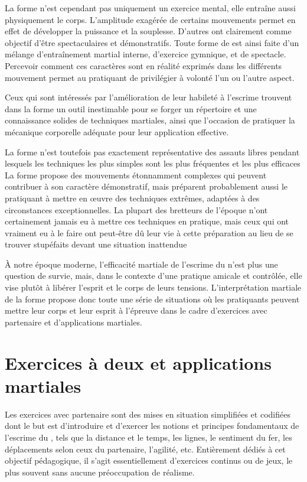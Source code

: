 La forme n'est cependant pas uniquement un exercice mental, elle entraîne aussi physiquement le corps. 
L'amplitude exagérée de certains mouvements permet en effet de développer la puissance et la souplesse.
D'autres ont clairement comme objectif d'être spectaculaires et démonstratifs.
Toute forme de \Taijijian{} est ainsi faite d'un mélange d'entraînement martial interne, d'exercice gymnique, et de spectacle.
Percevoir comment ces caractères sont en réalité exprimés dans les différents mouvement permet au pratiquant de privilégier à volonté l'un ou l'autre aspect. 

Ceux qui sont intéressés par l'amélioration de leur habileté à l'escrime trouvent dans la forme un outil inestimable pour se forger un répertoire et une connaissance solides de techniques martiales, ainsi que l'occasion de pratiquer la mécanique corporelle adéquate pour leur application effective.

La forme n'est toutefois pas exactement représentative des assauts libres pendant lesquels les techniques les plus simples sont les plus fréquentes et les plus efficaces
La forme propose des mouvements étonnamment complexes qui peuvent contribuer à son caractère démonstratif, mais préparent probablement aussi le pratiquant à mettre en \oe{}uvre des techniques extrêmes, adaptées à des circonstances exceptionnelles.
La plupart des bretteurs de l'époque n'ont certainement jamais eu à mettre ces techniques en pratique, mais ceux qui ont vraiment eu à le faire ont peut-être dû leur vie à cette préparation au lieu de se trouver stupéfaits devant une situation inattendue

\`{A} notre époque moderne, l'efficacité martiale de l'escrime du \Taiji{} n'est plus une question de survie, mais, dans le contexte d'une pratique amicale et contrôlée, elle vise plutôt à libérer l'esprit et le corps de leurs tensions.
L'interprétation martiale de la forme propose donc toute une série de situations où les pratiquants peuvent mettre leur corps et leur esprit à l'épreuve dans le cadre d'exercices avec partenaire et d'applications martiales.

\section{Exercices à deux et applications martiales}
Les exercices avec partenaire sont des mises en situation simplifiées et codifiées dont le but est d'introduire et d'exercer les notions et principes fondamentaux de l'escrime du \Taiji{}, tels que la distance et le temps, les lignes, le sentiment du fer, les déplacements selon ceux du partenaire, l'agilité, etc.
Entièrement dédiés à cet objectif pédagogique, il s'agit essentiellement d'exercices continus ou de jeux, le plus souvent sans aucune préoccupation de réalisme.


